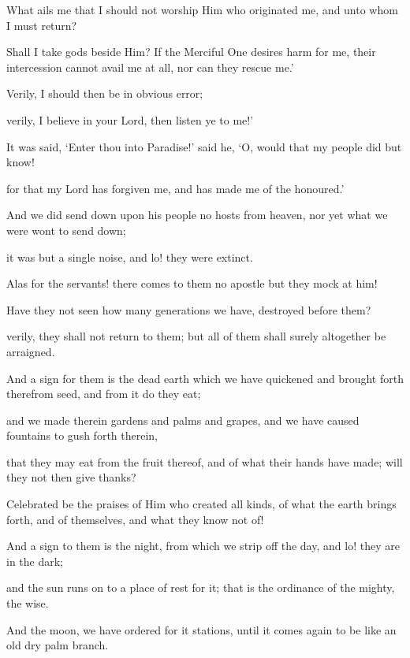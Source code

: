 \documentclass[fontsize=14pt, letterpaper, notitlepage, openany, DIV=12]{scrbook} %
\begin{document}
\noindent[36:22]
What ails me that I should not worship Him who originated me, and unto whom I must
return?

\noindent[36:23]
Shall I take gods beside Him? If the Merciful One desires harm for me, their intercession
cannot avail me at all, nor can they rescue me.'

\noindent[36:24]
Verily, I should then be in obvious error;

\noindent[36:25]
verily, I believe in your Lord, then listen ye to me!'

\noindent[36:26]
It was said, `Enter thou into Paradise!' said he, `O, would that my people did but know!

\noindent[36:27]
for that my Lord has forgiven me, and has made me of the honoured.'

\noindent[36:28]
And we did send down upon his people no hosts from heaven, nor yet what we were wont
to send down;

\noindent[36:29]
it was but a single noise, and lo! they were extinct.

\noindent[36:30]
Alas for the servants! there comes to them no apostle but they mock at him!

\noindent[36:31]
Have they not seen how many generations we have, destroyed before them?

\noindent[36:32]
verily, they shall not return to them; but all of them shall surely altogether be arraigned.

\noindent[36:33]
And a sign for them is the dead earth which we have quickened and brought forth
therefrom seed, and from it do they eat;

\noindent[36:34]
and we made therein gardens and palms and grapes, and we have caused fountains to
gush forth therein,

\noindent[36:35]
that they may eat from the fruit thereof, and of what their hands have made; will they not
then give thanks?

\noindent[36:36]
Celebrated be the praises of Him who created all kinds, of what the earth brings forth,
and of themselves, and what they know not of!

\noindent[36:37]
And a sign to them is the night, from which we strip off the day, and lo! they are in the
dark;

\noindent[36:38]
and the sun runs on to a place of rest for it; that is the ordinance of the mighty, the wise.

\noindent[36:39]
And the moon, we have ordered for it stations, until it comes again to be like an old dry
palm branch.
\end{document}
